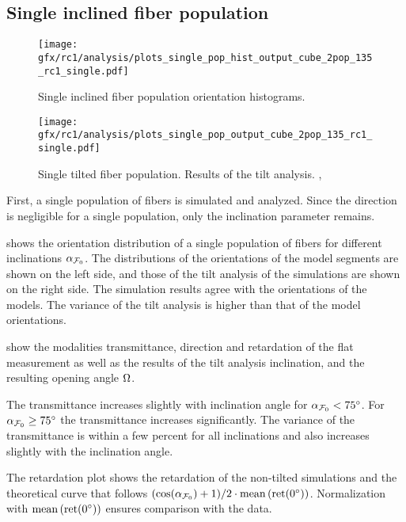 \subsection{Single inclined fiber population}
\label{sec:resSingleIncl}
%
\begin{figure}[!t]
\centering
\texttt{[image: gfx/rc1/analysis/plots\_single\_pop\_hist\_output\_cube\_2pop\_135\_rc1\_single.pdf]}
\caption{Single inclined fiber population orientation histograms.}
\label{fig:single_fiber_pop_hist}
\end{figure}
%
\begin{figure}[!p]
\centering
\texttt{[image: gfx/rc1/analysis/plots\_single\_pop\_output\_cube\_2pop\_135\_rc1\_single.pdf]}
\caption{Single tilted fiber population. Results of the tilt analysis. , }
\label{fig:single_fiber_pop_rofl}
\end{figure}
%
First, a single population of fibers is simulated and analyzed.
Since the direction is negligible for a single population, only the inclination parameter \modelInc{} remains.
\par
%
 shows the orientation distribution of a single population of fibers for different inclinations $\textnormal{$\alpha_{\textnormal{$\mathcal{F}_0$}}$}{}$.
The distributions of the orientations of the model segments are shown on the left side, and those of the tilt analysis of the simulations are shown on the right side.
The simulation results agree with the orientations of the models.
The variance of the tilt analysis is higher than that of the model orientations.
\par
%
 show the modalities transmittance, direction and retardation of the flat measurement as well as the results of the tilt analysis inclination, \trel{} and the resulting opening angle $\textnormal{$\Omega$}$.
\par
% 
The transmittance increases slightly with inclination angle for $\textnormal{$\alpha_{\textnormal{$\mathcal{F}_0$}}$}<\SI{75}{\degree}$.
For $\textnormal{$\alpha_{\textnormal{$\mathcal{F}_0$}}$} \ge \SI{75}{\degree}$ the transmittance increases significantly.
The variance of the transmittance is within a few percent for all inclinations and also increases slightly with the inclination angle.
\par
%
The retardation plot shows the retardation of the non-tilted simulations and the theoretical curve that follows $(\cos(\textnormal{$\alpha_{\textnormal{$\mathcal{F}_0$}}$}) + 1) / 2 \cdot \operatorname{mean}\left(\mathrm{ret}(\SI{0}{\degree})\right)$.
Normalization with $\operatorname{mean}\left(\mathrm{ret}(\SI{0}{\degree})\right)$ ensures comparison with the data.
